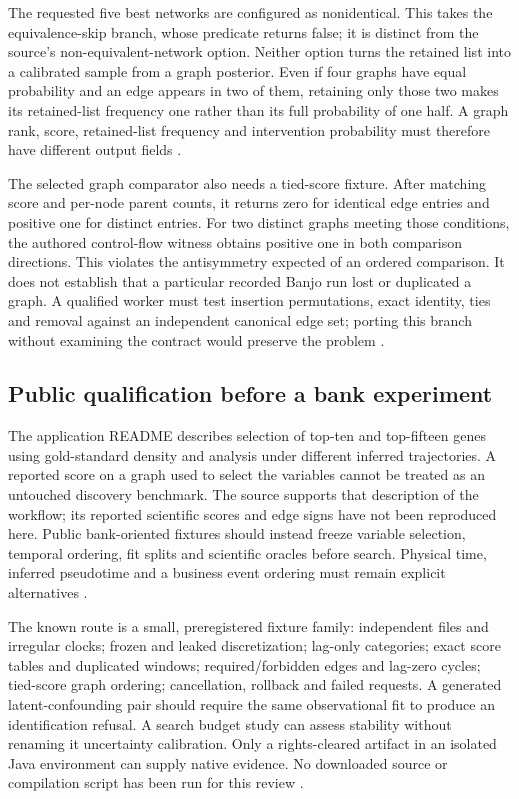 The requested five best networks are configured as nonidentical. This takes
the equivalence-skip branch, whose predicate returns false; it is distinct
from the source's non-equivalent-network option. Neither option turns the
retained list into a calibrated sample from a graph posterior. Even if four
graphs have equal probability and an edge appears in two of them, retaining
only those two makes its retained-list frequency one rather than its full
probability of one half. A graph rank, score, retained-list frequency and
intervention probability must therefore have different output fields
\citep{exec24_banjo_source,exec24_banjo_choice}.

The selected graph comparator also needs a tied-score fixture. After matching
score and per-node parent counts, it returns zero for identical edge entries
and positive one for distinct entries. For two distinct graphs meeting those
conditions, the authored control-flow witness obtains positive one in both
comparison directions. This violates the antisymmetry expected of an ordered
comparison. It does not establish that a particular recorded Banjo run lost
or duplicated a graph. A qualified worker must test insertion permutations,
exact identity, ties and removal against an independent canonical edge set;
porting this branch without examining the contract would preserve the
problem \citep{exec24_banjo_source,exec24_banjo_choice}.

\subsection{Public qualification before a bank experiment}
The application README describes selection of top-ten and top-fifteen genes
using gold-standard density and analysis under different inferred
trajectories. A reported score on a graph used to select the variables cannot
be treated as an untouched discovery benchmark. The source supports that
description of the workflow; its reported scientific scores and edge signs
have not been reproduced here. Public bank-oriented fixtures should instead
freeze variable selection, temporal ordering, fit splits and scientific
oracles before search. Physical time, inferred pseudotime and a business
event ordering must remain explicit alternatives
\citep{exec24_banjo_source}.

The known route is a small, preregistered fixture family: independent files
and irregular clocks; frozen and leaked discretization; lag-only categories;
exact score tables and duplicated windows; required/forbidden edges and
lag-zero cycles; tied-score graph ordering; cancellation, rollback and failed
requests. A generated latent-confounding pair should require the same
observational fit to produce an identification refusal. A search budget
study can assess stability without renaming it uncertainty calibration.
Only a rights-cleared artifact in an isolated Java environment can supply
native evidence. No downloaded source or compilation script has been run
for this review \citep{exec24_banjo_choice}.

